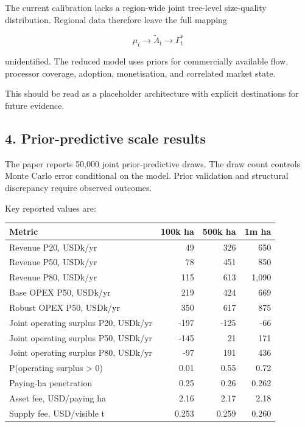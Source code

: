 The current calibration lacks a region-wide joint tree-level size-quality
distribution. Regional data therefore leave the full mapping

\[
\mu_t\to\widetilde\Lambda_t\to\Gamma_t^*
\]

unidentified. The reduced model uses priors for commercially available flow,
processor coverage, adoption, monetisation, and correlated market state.

This should be read as a placeholder architecture with explicit destinations
for future evidence.

\subsection{4. Prior-predictive scale results}\label{prior-predictive-scale-results}

The paper reports 50,000 joint prior-predictive draws. The draw count controls
Monte Carlo error conditional on the model. Prior validation and structural
discrepancy require observed outcomes.

Key reported values are:

{\def\LTcaptype{none} %
\begin{longtable}[]{@{}lrrr@{}}
\toprule\noalign{}
Metric & 100k ha & 500k ha & 1m ha \\
\midrule\noalign{}
\endhead
\bottomrule\noalign{}
\endlastfoot
Revenue P20, USDk/yr & 49 & 326 & 650 \\
Revenue P50, USDk/yr & 78 & 451 & 850 \\
Revenue P80, USDk/yr & 115 & 613 & 1,090 \\
Base OPEX P50, USDk/yr & 219 & 424 & 669 \\
Robust OPEX P50, USDk/yr & 350 & 617 & 875 \\
Joint operating surplus P20, USDk/yr & -197 & -125 & -66 \\
Joint operating surplus P50, USDk/yr & -145 & 21 & 171 \\
Joint operating surplus P80, USDk/yr & -97 & 191 & 436 \\
P(operating surplus \textgreater{} 0) & 0.01 & 0.55 & 0.72 \\
Paying-ha penetration & 0.25 & 0.26 & 0.262 \\
Asset fee, USD/paying ha & 2.16 & 2.17 & 2.18 \\
Supply fee, USD/visible t & 0.253 & 0.259 & 0.260 \\
\end{longtable}
}

